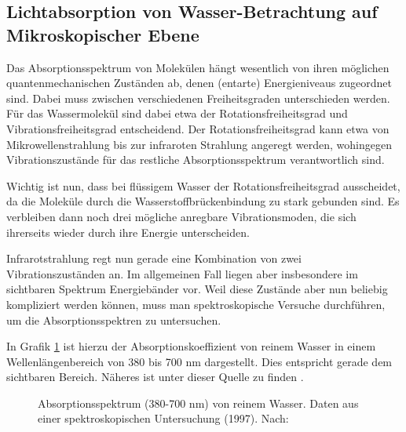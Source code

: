\documentclass[12pt,a4paper,titlepage,headinclude,bibtotoc]{scrartcl}
\numberwithin{equation}{subsection}
\begin{document}
\subsection{Lichtabsorption von Wasser-Betrachtung auf Mikroskopischer Ebene}
\label{sec:absorblicht}
Das Absorptionsspektrum von Molekülen hängt wesentlich von ihren möglichen 
quantenmechanischen Zuständen ab, denen (entarte) Energieniveaus zugeordnet sind. Dabei muss zwischen verschiedenen Freiheitsgraden
unterschieden werden. Für das Wassermolekül sind dabei etwa der Rotationsfreiheitsgrad und Vibrationsfreiheitsgrad entscheidend.
Der Rotationsfreiheitsgrad kann etwa von Mikrowellenstrahlung bis zur infraroten Strahlung angeregt werden, wohingegen Vibrationszustände für das restliche Absorptionsspektrum verantwortlich sind.


Wichtig ist nun, dass bei flüssigem Wasser der Rotationsfreiheitsgrad ausscheidet, da die Moleküle durch die Wasserstoffbrückenbindung zu stark gebunden sind.
Es verbleiben dann noch drei mögliche anregbare Vibrationsmoden, die sich ihrerseits wieder durch ihre Energie unterscheiden.

Infrarotstrahlung regt nun gerade eine Kombination von zwei Vibrationszuständen an.
Im allgemeinen Fall liegen aber insbesondere im sichtbaren Spektrum Energiebänder vor.
Weil diese Zustände aber nun beliebig kompliziert werden können, muss man spektroskopische Versuche durchführen, um die Absorptionsspektren zu untersuchen.

In Grafik \ref{fig:abs} ist hierzu der Absorptionskoeffizient von reinem Wasser in einem Wellenlängenbereich von 380 bis 700 nm dargestellt.
Dies entspricht gerade dem sichtbaren Bereich.
Näheres ist unter dieser Quelle zu finden \cite{abs}.

\begin{figure}[h]
	\centering
	
	\caption{Absorptionsspektrum (380-700 $\si{\nano \metre}$) von reinem Wasser. Daten aus einer spektroskopischen Untersuchung (1997). Nach: \cite{speck}}
	\label{fig:abs}
\end{figure}
\end{document}
